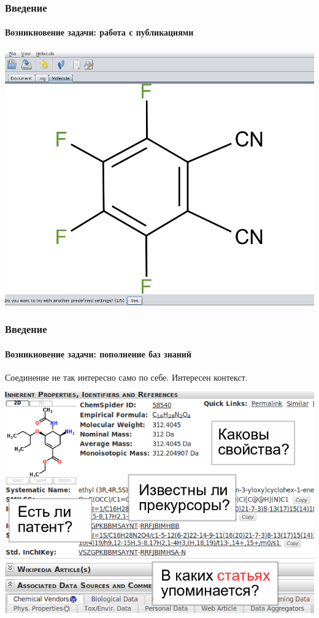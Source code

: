\begin{frame}
  \frametitle{Введение}
  \framesubtitle{Возникновение задачи: работа с публикациями}
  \begin{center}
    \href{run:media/demo.wmv}{\includegraphics[scale=0.25]{media/demo.png}}
  \end{center}
\end{frame}

\begin{frame}
  \frametitle{Введение}
  \framesubtitle{Возникновение задачи: пополнение баз знаний}
  Соединение не так интересно само по себе. Интересен контекст.
  \begin{center}
     \includegraphics[scale=0.4]{media/chemspider.png}
  \end{center}
\end{frame}

